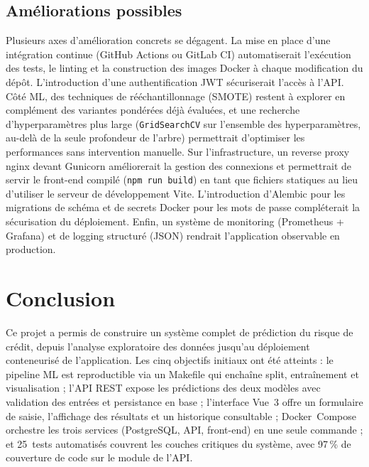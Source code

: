 \documentclass[12pt,a4paper,openany]{report}
\begin{document}
\section{Améliorations possibles}

Plusieurs axes d'amélioration concrets se dégagent. La mise en place d'une intégration continue (GitHub Actions ou GitLab CI) automatiserait l'exécution des tests, le linting et la construction des images Docker à chaque modification du dépôt. L'introduction d'une authentification JWT sécuriserait l'accès à l'API. Côté ML, des techniques de rééchantillonnage (SMOTE) restent à explorer en complément des variantes pondérées déjà évaluées, et une recherche d'hyperparamètres plus large (\texttt{GridSearchCV} sur l'ensemble des hyperparamètres, au-delà de la seule profondeur de l'arbre) permettrait d'optimiser les performances sans intervention manuelle. Sur l'infrastructure, un reverse proxy nginx devant Gunicorn améliorerait la gestion des connexions et permettrait de servir le front-end compilé (\texttt{npm run build}) en tant que fichiers statiques au lieu d'utiliser le serveur de développement Vite. L'introduction d'Alembic pour les migrations de schéma et de secrets Docker pour les mots de passe compléterait la sécurisation du déploiement. Enfin, un système de monitoring (Prometheus + Grafana) et de logging structuré (JSON) rendrait l'application observable en production.


\chapter{Conclusion}

Ce projet a permis de construire un système complet de prédiction du risque de crédit, depuis l'analyse exploratoire des données jusqu'au déploiement conteneurisé de l'application. Les cinq objectifs initiaux ont été atteints : le pipeline ML est reproductible via un Makefile qui enchaîne split, entraînement et visualisation ; l'API REST expose les prédictions des deux modèles avec validation des entrées et persistance en base ; l'interface Vue~3 offre un formulaire de saisie, l'affichage des résultats et un historique consultable ; Docker~Compose orchestre les trois services (PostgreSQL, API, front-end) en une seule commande ; et 25~tests automatisés couvrent les couches critiques du système, avec 97\,\% de couverture de code sur le module de l'API.
\end{document}
